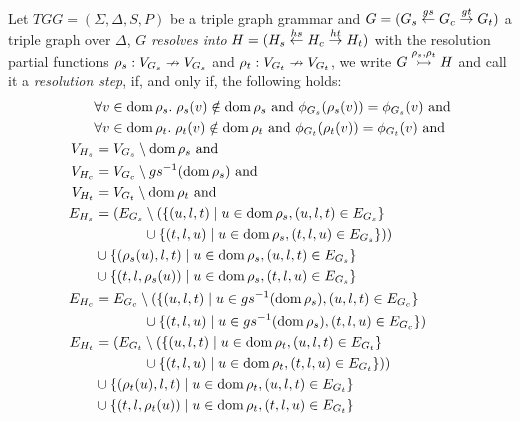 \begin{definition}
	\label{def:tresolv}
	Let $TGG = (\Sigma, \Delta, S, P)$ be a triple graph grammar and $G = (G_s \overset{gs}{\leftarrow} G_c \overset{gt}{\rightarrow} G_t)$ a triple graph over $\Delta$, $G$ \emph{resolves into} $H = (H_s \overset{hs}{\leftarrow} H_c \overset{ht}{\rightarrow} H_t)$ with the resolution partial functions $\rho_s: V_{G_s} \nrightarrow V_{G_s}$ and $\rho_t: V_{G_t} \nrightarrow V_{G_t}$, we write $G \overset{\rho_s, \rho_t}{\rightarrowtail} H$ and call it a \emph{resolution step}, if, and only if, the following holds:
	\begin{align*}
	& \forall v \in \operatorname{dom} \rho_s . \; \rho_s(v) \notin \operatorname{dom} \rho_s \text{ and } \phi_{G_s}(\rho_s(v)) = \phi_{G_s}(v) \text{ and}\\
	& \forall v \in \operatorname{dom} \rho_t . \; \rho_t(v) \notin \operatorname{dom} \rho_t \text{ and } \phi_{G_t}(\rho_t(v)) = \phi_{G_t}(v) \text{ and}\\
	V_{H_s} & = V_{G_s} \setminus \operatorname{dom}  \rho_s\text{ and}\\
	V_{H_c} & = V_{G_c} \setminus gs^{-1}(\operatorname{dom}  \rho_s) \text{ and}\\
	V_{H_t} & = V_{G_t} \setminus \operatorname{dom}  \rho_t\text{ and}\\
	E_{H_s} & = (E_{G_s} \setminus (\{(u,l,t) \; | \; u \in \operatorname{dom} \rho_s, (u,l,t) \in E_{G_s}\} \\
			&\hspace{3.5em} \cup \{(t,l,u) \; | \; u \in \operatorname{dom} \rho_s, (t,l,u) \in E_{G_s}\}))\\
	& \cup \{(\rho_s(u),l,t) \; | \; u \in \operatorname{dom} \rho_s, (u,l,t) \in E_{G_s}\} \\
	& \cup \{(t,l,\rho_s(u)) \; | \; u \in \operatorname{dom} \rho_s, (t,l,u) \in E_{G_s}\} \\
	E_{H_c} & = E_{G_c} \setminus (\{(u,l,t) \; | \; u \in gs^{-1}(\operatorname{dom} \rho_s), (u,l,t) \in E_{G_c}\} \\
			&\hspace{3.5em} \cup \{(t,l,u) \; | \; u \in gs^{-1}(\operatorname{dom} \rho_s), (t,l,u) \in E_{G_c}\})\\
	E_{H_t} & = (E_{G_t} \setminus (\{(u,l,t) \; | \; u \in \operatorname{dom} \rho_t, (u,l,t) \in E_{G_t}\} \\
	&\hspace{3.5em} \cup \{(t,l,u) \; | \; u \in \operatorname{dom} \rho_t, (t,l,u) \in E_{G_t}\}))\\
	& \cup \{(\rho_t(u),l,t) \; | \; u \in \operatorname{dom} \rho_t, (u,l,t) \in E_{G_t}\} \\
	& \cup \{(t,l,\rho_t(u)) \; | \; u \in \operatorname{dom} \rho_t, (t,l,u) \in E_{G_t}\}
	\end{align*}
\end{definition}

